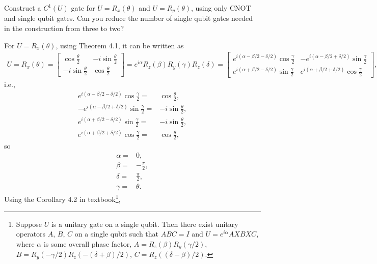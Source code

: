 \documentclass[en]{sol-man}
\begin{document}
\begin{exe}
    Construct a $C^1(U)$ gate for $U=R_x(\theta)$ and $U=R_y(\theta)$, using only CNOT and single qubit gates. Can you reduce the number of single qubit gates needed in the construction from three to two?
\end{exe}
\begin{sol}
    For $U=R_x(\theta)$, using Theorem 4.1, it can be written as
    \begin{align}
        U=R_x(\theta)=\begin{bmatrix}
            \cos\frac{\theta}{2}&-i\sin\frac{\theta}{2}\\
            -i\sin\frac{\theta}{2}&\cos\frac{\theta}{2}
        \end{bmatrix}=e^{i\alpha}R_z(\beta)R_y(\gamma)R_z(\delta)=\begin{bmatrix}
            e^{i(\alpha-\beta/2-\delta/2)}\cos\frac{\gamma}{2}&-e^{i(\alpha-\beta/2+\delta/2)}\sin\frac{\gamma}{2}\\
            e^{i(\alpha+\beta/2-\delta/2)}\sin\frac{\gamma}{2}&e^{i(\alpha+\beta/2+\delta/2)}\cos\frac{\gamma}{2}
        \end{bmatrix},
    \end{align}
    i.e.,
    \begin{align}
        e^{i(\alpha-\beta/2-\delta/2)}\cos\frac{\gamma}{2}=&\cos\frac{\theta}{2},\\
        -e^{i(\alpha-\beta/2+\delta/2)}\sin\frac{\gamma}{2}=&-i\sin\frac{\theta}{2},\\
        e^{i(\alpha+\beta/2-\delta/2)}\sin\frac{\gamma}{2}=&-i\sin\frac{\theta}{2},\\
        e^{i(\alpha+\beta/2+\delta/2)}\cos\frac{\gamma}{2}=&\cos\frac{\theta}{2},
    \end{align}
    so
    \begin{align}
        \alpha=&0,\\
        \beta=&-\frac{\pi}{2},\\
        \delta=&\frac{\pi}{2},\\
        \gamma=&\theta.
    \end{align}
    Using the Corollary 4.2 in textbook\footnote{\label{Cor-4.2-U=exp(i alpha)AXBXC}Suppose $U$ is a unitary gate on a single qubit. Then there exist unitary operators $A$, $B$, $C$ on a single qubit such that $ABC=I$ and $U=e^{i\alpha}AXBXC$, where $\alpha$ is some overall phase factor, $A=R_z(\beta)R_y(\gamma/2)$, $B=R_y(-\gamma/2)R_z(-(\delta+\beta)/2)$, $C=R_z((\delta-\beta)/2)$.},

\end{sol}
\end{document}

